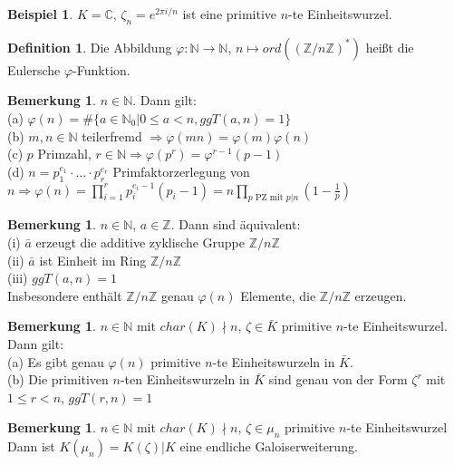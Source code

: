 \documentclass[10pt,a4paper,numbers=endperiod]{scrreprt}
\theoremstyle{definition}
\newtheorem{defi}[satz]{Definition}
\newtheorem{bem}[satz]{Bemerkung}
\newtheorem{bsp}[satz]{Beispiel}
\def\CC{{\mathbb C}}
\def\NN{{\mathbb N}}
\def\ZZ{{\mathbb Z}}
\begin{document}
\begin{bsp}
	$K = \CC$, $\zeta_n = e^{2\pi i/n}$ ist eine primitive $n$-te Einheitswurzel.
\end{bsp}

\begin{defi}
	Die Abbildung $\varphi: \NN \rightarrow \NN$, $n \mapsto ord((\ZZ/n\ZZ)^*)$ heißt die Eulersche $\varphi$-Funktion. 
\end{defi}

\begin{bem}
	$n \in \NN$. Dann gilt:\\
	(a) $\varphi(n) = \#\{a \in \NN_0| 0 \leq a < n, ggT(a,n) = 1\}$ \\
	(b) $m, n \in \NN$ teilerfremd $\Rightarrow \varphi(mn) = \varphi(m) \varphi(n)$\\
	(c) $p$ Primzahl, $r \in \NN \Rightarrow \varphi(p^r) = \varphi^{r-1}(p-1)$\\
	(d) $n = p_1^{e_1} \cdot \ldots \cdot p_r^{e_r}$ Primfaktorzerlegung von $n \Rightarrow \varphi(n) = \prod\limits_{i = 1}^{r} p_i^{e_i -1} (p_i -1) = n \prod\limits_{p \text{ PZ mit } p|n} (1- \frac{1}{p})$\\
\end{bem}

\begin{bem}
	$n \in \NN$, $a \in \ZZ$. Dann sind äquivalent:\\
	(i) $\bar{a}$ erzeugt die additive zyklische Gruppe $\ZZ/n\ZZ$\\
	(ii) $\bar{a}$ ist Einheit im Ring $\ZZ/n\ZZ$\\
	(iii) $ggT(a,n) = 1$\\
	Insbesondere enthält $\ZZ/n\ZZ$ genau $\varphi(n)$ Elemente, die $\ZZ/n\ZZ$ erzeugen.
\end{bem}

\begin{bem}
	$n \in \NN$ mit $char(K) \nmid n$, $\zeta \in \bar{K}$ primitive $n$-te Einheitswurzel. Dann gilt:\\
	(a) Es gibt genau $\varphi(n)$ primitive $n$-te Einheitswurzeln in $\bar{K}$.\\
	(b) Die primitiven $n$-ten Einheitswurzeln in $\bar{K}$ sind genau von der Form $\zeta^r$ mit $1 \leq r < n$, $ggT(r,n) = 1$
\end{bem}

\begin{bem}
	$n \in \NN$ mit $char(K) \nmid n$, $\zeta \in \mu_n$ primitive $n$-te Einheitswurzel\\
	Dann ist $K(\mu_n) = K(\zeta)|K$ eine endliche Galoiserweiterung.
\end{bem}
\end{document}
